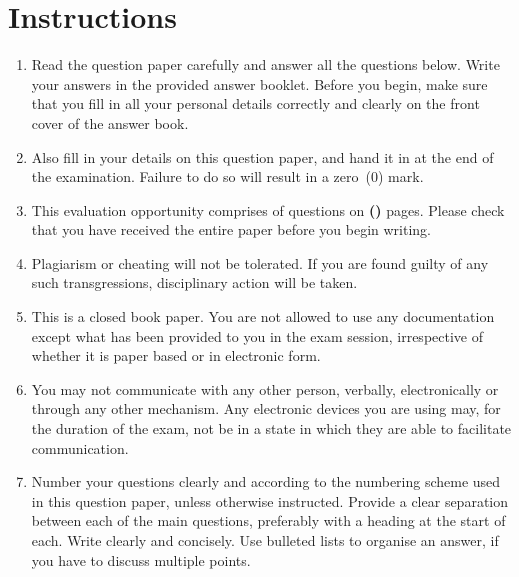 
\section*{Instructions}
\begin{enumerate}
	\item Read the question paper carefully and answer all the questions below. Write your answers in the provided answer booklet. Before you begin, make sure that you fill in all your personal details correctly and clearly on the front cover of the answer book.
	
	\item Also fill in your details on this question paper, and hand it in at the end of the examination. Failure to do so will result in a zero~(0) mark.
	
	\item This evaluation opportunity comprises of \textbf{\numquestions} questions on \textbf{(\numpages)} pages. Please check that you have received the entire paper before you begin writing.
	      
	\item Plagiarism or cheating will not be tolerated. If you are found guilty of any such transgressions, disciplinary action will be taken.
	
	\item This is a closed book paper. You are not allowed to use any documentation except what has been provided to you in the exam session, irrespective of whether it is paper based or in electronic form.
	
	\item You may not communicate with any other person, verbally, electronically or through any other mechanism. Any electronic devices you are using may, for the duration of the exam, not be in a state in which they are able to facilitate communication. 
	
	\item Number your questions clearly and according to the numbering scheme used in this question paper, unless otherwise instructed. Provide a clear separation between each of the main questions, preferably with a heading at the start of each. Write clearly and concisely. Use bulleted lists to organise an answer, if you have to discuss multiple points. 
\end{enumerate}
